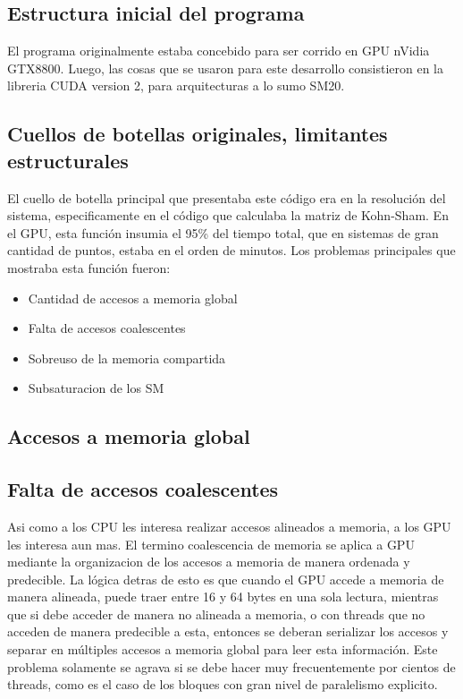 \subsection{Estructura inicial del programa}

El programa originalmente estaba concebido para ser corrido en GPU nVidia GTX8800.
Luego, las cosas que se usaron para este desarrollo consistieron en la libreria CUDA version
2, para arquitecturas a lo sumo SM20.


\subsection{Cuellos de botellas originales, limitantes estructurales}

El cuello de botella principal que presentaba este c\'odigo era en la
resoluci\'on del sistema, especificamente en el c\'odigo que calculaba la matriz de Kohn-Sham.
En el GPU, esta funci\'on insumia el 95\% del tiempo total, que en sistemas de gran cantidad
de puntos, estaba en el orden de minutos. Los problemas principales que mostraba esta funci\'on fueron:
\begin{itemize}
\item Cantidad de accesos a memoria global
\item Falta de accesos coalescentes
\item Sobreuso de la memoria compartida
\item Subsaturacion de los SM
\end{itemize}

\subsection{Accesos a memoria global}

\subsection{Falta de accesos coalescentes}
Asi como a los CPU les interesa realizar accesos alineados a memoria, a los GPU les
interesa aun mas. El termino coalescencia de memoria se aplica a GPU mediante
la organizacion de los accesos a memoria de manera ordenada y predecible. La l\'ogica
detras de esto es que cuando el GPU accede a memoria de manera alineada, puede traer
entre 16 y 64 bytes en una sola lectura, mientras que si debe acceder de manera no
alineada a memoria, o con threads que no acceden de manera predecible a esta, entonces
se deberan serializar los accesos y separar en m\'ultiples accesos a memoria global para leer
esta informaci\'on. Este problema solamente se agrava si se debe hacer muy frecuentemente
por cientos de threads, como es el caso de los bloques con gran nivel de paralelismo explicito.

